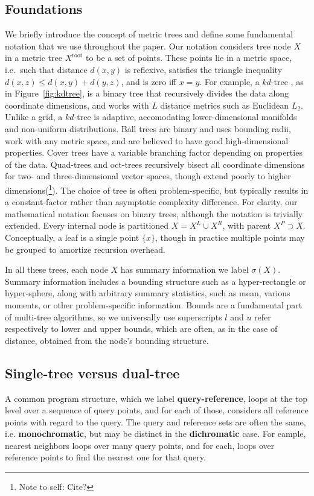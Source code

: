 \documentclass[twoside,leqno,twocolumn]{article}
\newcommand{\authornote}[1]{(\footnote{Note to self: #1})}
\newcommand{\authorsnote}[1]{\authornote{#1}}
\newcommand{\union}{\cup}
\newcommand{\fig}[1]{Figure~\ref{fig:#1}}
\newcommand{\mysub}[1]{\subsection{#1} }
\newcommand{\defterm}[1]{{\bf #1}}
\newcommand{\kdroot}[1]{#1^{\text{root}}}
\newcommand{\kdleft}[1]{#1^{\!L}}
\newcommand{\kdright}[1]{#1^{\!R}}
\newcommand{\kdparent}[1]{#1^{\!P}}
\newcommand{\dist}[2]{d(#1,#2)}
\newcommand{\outstat}{\sigma}
\begin{document}
\mysub{Foundations}
We briefly introduce the concept of metric trees and define some fundamental notation that we use throughout the paper.
Our notation considers tree node $X$ in a metric tree $\kdroot{X}$ to be a set of points.
These points lie in a metric space, i.e.~such that distance $\dist{x}{y}$ is reflexive, satisfies the triangle inequality $\dist{x}{z} \leq \dist{x}{y} + \dist{y}{z}$, and is zero iff $x = y$.
For example, a $kd$-tree \cite{preparata_kdtrees}, as in \fig{kdtree}, is a binary tree that recursively divides the data along coordinate dimensions, and works with $L$ distance metrics such as Euclidean $L_2$.
Unlike a grid, a $kd$-tree is adaptive, accomodating lower-dimensional manifolds and non-uniform distributions.
Ball trees \cite{anchors_balltrees_moore} are binary and uses bounding radii, work with any metric space, and are believed to have good high-dimensional properties.
Cover trees \cite{covertrees} have a variable branching factor depending on properties of the data.
Quad-trees and oct-trees recursively bisect all coordinate dimensions for two- and three-dimensional vector spaces, though extend poorly to higher dimensions\authorsnote{Cite?}.
The choice of tree is often problem-specific, but typically results in a constant-factor rather than asymptotic complexity difference.
For clarity, our mathematical notation focuses on binary trees, although the notation is trivially extended.
Every internal node is partitioned $X = \kdleft{X} \union \kdright{X}$, with parent $\kdparent{X} \supset X$.
Conceptually, a leaf is a single point $\{x\}$, though in practice multiple points may be grouped to amortize recursion overhead.

In all these trees, each node $X$ has summary information we label $\outstat(X)$.
Summary information includes a bounding structure such as a hyper-rectangle or hyper-sphere, along with arbitrary summary statistics, such as mean, various moments, or other problem-specific information.
Bounds are a fundamental part of multi-tree algorithms, so we universally use superscripts $l$ and $u$ refer respectively to lower and upper bounds, which are often, as in the case of distance, obtained from the node's bounding structure.

\mysub{Single-tree versus dual-tree}
A common program structure, which we label \defterm{query-reference}, loops at the top level over a sequence of query points, and for each of those, considers all reference points with regard to the query.
The query and reference sets are often the same, i.e. \defterm{monochromatic}, but may be distinct in the \defterm{dichromatic} case.
For eample, nearest neighbors loops over many query points, and for each, loops over reference points to find the nearest one for that query.
\end{document}

